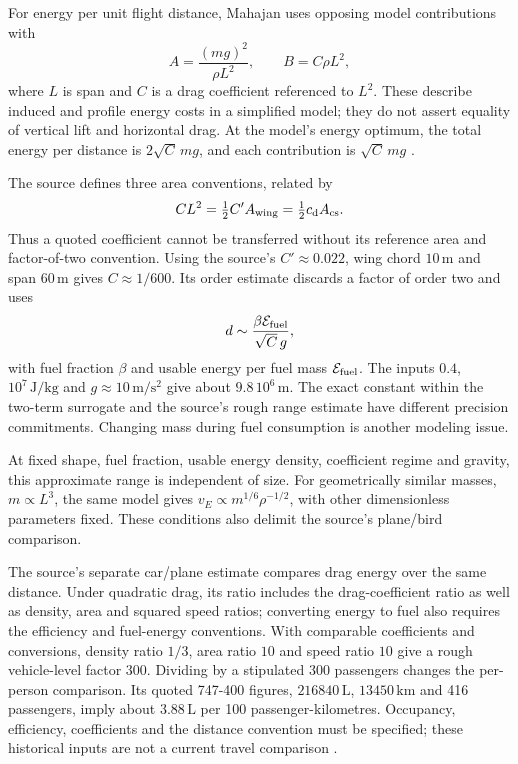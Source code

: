 For energy per unit flight distance, Mahajan uses opposing model contributions with
\[
 A=\frac{(mg)^2}{\rho L^2},\qquad B=C\rho L^2,
\]
where \(L\) is span and \(C\) is a drag coefficient referenced to \(L^2\).
These describe induced and profile energy costs in a simplified model;
they do not assert equality of vertical lift and horizontal drag.
At the model's energy optimum, the total energy per distance is
\(2\sqrt C\,mg\), and each contribution is \(\sqrt C\,mg\)
\cite[4.6]{Mahajan2014Insight}.

The source defines three area conventions, related by
\[
 CL^2=\tfrac12 C' A_{\rm wing}=\tfrac12c_{\rm d}A_{\rm cs}.
\]
Thus a quoted coefficient cannot be transferred without its reference area
and factor-of-two convention. Using the source's
\(C'\approx0.022\), wing chord \(10\,\mathrm m\) and span \(60\,\mathrm m\)
gives \(C\approx1/600\).
Its order estimate discards a factor of order two and uses
\[
 d\sim\frac{\beta\mathcal E_{\rm fuel}}{\sqrt C\,g},
\]
with fuel fraction \(\beta\) and usable energy per fuel mass
\(\mathcal E_{\rm fuel}\). The inputs \(0.4\), \(10^7\,\mathrm{J/kg}\)
and \(g\approx10\,\mathrm{m/s^2}\) give about \(9.8\,10^6\,\mathrm m\).
The exact constant within the two-term surrogate and the source's rough
range estimate have different precision commitments.
Changing mass during fuel consumption is another modeling issue.

At fixed shape, fuel fraction, usable energy density, coefficient regime
and gravity, this approximate range is independent of size.
For geometrically similar masses, \(m\propto L^3\), the same model gives
\(v_E\propto m^{1/6}\rho^{-1/2}\), with other dimensionless parameters fixed.
These conditions also delimit the source's plane/bird comparison.

The source's separate car/plane estimate compares drag energy over the same
distance. Under quadratic drag, its ratio includes the drag-coefficient ratio
as well as density, area and squared speed ratios; converting energy to fuel
also requires the efficiency and fuel-energy conventions. With comparable
coefficients and conversions, density ratio \(1/3\), area ratio \(10\) and speed
ratio \(10\) give a rough vehicle-level factor \(300\).
Dividing by a stipulated \(300\) passengers changes the per-person comparison.
Its quoted 747-400 figures, \(216840\,\mathrm L\), \(13450\,\mathrm{km}\)
and 416 passengers, imply about \(3.88\,\mathrm L\) per
100 passenger-kilometres. Occupancy, efficiency, coefficients and the
distance convention must be specified; these historical inputs are not a
current travel comparison \cite[4.3.2]{Mahajan2014Insight}.

